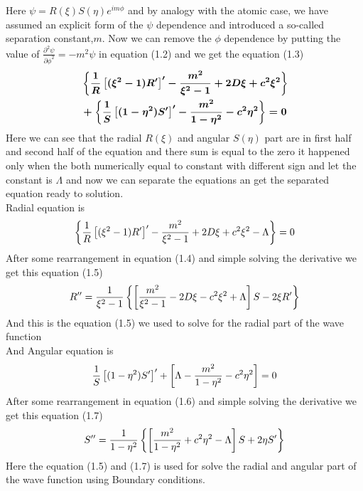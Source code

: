 \documentclass[12pt]{report}
\begin{document}
		\normalsize{Here \boldmath $\psi = R(\xi)S(\eta){e}^{im\phi} $ and by analogy with the atomic case, we have assumed an explicit form of the $\psi$ dependence and introduced a so-called separation constant,\boldmath $m$. Now we can remove the $\phi$ dependence by putting the value of $\frac{{\partial}^{2}\psi}{{\partial\phi}^{2}}=-{m}^{2}\psi$ in equation (1.2) and we get the equation (1.3)}
		\begin{equation}
			\boldmath \normalsize
			\begin{aligned}
				& \left\{\frac{1}{R}\left[({\xi}^{2}-1){R'}\right]'-\frac{m^{2}}{{\xi}^{2}-1} + 2D\xi + c^{2}{\xi}^{2}\right\} \\
				& + \left\{\frac{1}{S}\left[(1-{\eta}^{2})S'\right]'-\frac{m^{2}}{1-{\eta}^{2}} - c^{2}{\eta}^{2}\right\} = 0 
			\end{aligned}
		\end{equation}
		\normalsize{Here we can see that the radial $R(\xi)$ and angular $S(\eta)$ part are in first half and second half of the equation and there sum is equal to the zero it happened only when the both numerically equal to constant with different sign and let the constant is $\Lambda$ and now we can separate the equations an get the separated equation ready to solution.}\\
		\textbf \normalsize{Radial equation is }
		\begin{equation}
			\boldmath \normalsize
			\left\{\frac{1}{R}\left[({\xi}^{2}-1){R'}\right]'-\frac{m^{2}}{{\xi}^{2}-1} + 2D\xi + c^{2}{\xi}^{2} - \Lambda\right\} = 0 
		\end{equation}
		\normalsize After some rearrangement in equation (1.4) and simple solving the derivative we get this equation (1.5)
		\begin{equation}
			\boldmath \normalsize
			R''=\frac{1}{{\xi}^{2}-1}\left\{\left[\frac{m^{2}}{{\xi}^{2}-1} - 2D\xi - c^{2}{\xi}^{2} + \Lambda\right]S - 2\xi R' \right\}
		\end{equation}
		\normalsize And this is the equation (1.5) we used to solve for the radial part of the wave function\\
		\normalsize And Angular equation is 
		\begin{equation}
			\boldmath \normalsize
			\frac{1}{S}\left[(1-{\eta}^{2})S'\right]'+\left[\Lambda-\frac{m^{2}}{1-{\eta}^{2}} - c^{2}{\eta}^{2}\right] = 0 
		\end{equation}
		\normalsize After some rearrangement in equation (1.6) and simple solving the derivative we get this equation (1.7)
		\begin{equation}
			\boldmath \normalsize
			S'' = \frac{1}{1-{\eta}^{2}}\left\{\left[\frac{m^{2}}{1-{\eta}^{2}} + c^{2}{\eta}^{2}-\Lambda\right]S + 2\eta S'\right\}
		\end{equation}
		\normalsize Here the equation (1.5) and (1.7) is used for solve the radial and angular part of the wave function using Boundary conditions. 
\end{document}
